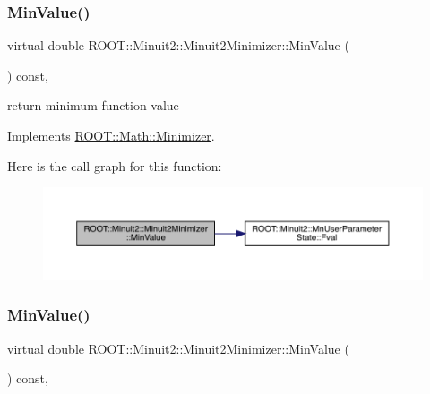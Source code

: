 \subsubsection{\texorpdfstring{MinValue()}{MinValue()}\hspace{0.1cm}{\footnotesize\ttfamily [1/3]}}
{\footnotesize\ttfamily virtual double R\+O\+O\+T\+::\+Minuit2\+::\+Minuit2\+Minimizer\+::\+Min\+Value (\begin{DoxyParamCaption}{ }\end{DoxyParamCaption}) const\hspace{0.3cm}{\ttfamily [inline]}, {\ttfamily [virtual]}}



return minimum function value 



Implements \mbox{\hyperlink{classROOT_1_1Math_1_1Minimizer_ae4845ff42bc0e244fdfa068c53b9a965}{R\+O\+O\+T\+::\+Math\+::\+Minimizer}}.

Here is the call graph for this function\+:
\nopagebreak
\begin{figure}[H]
\begin{center}
\leavevmode
\includegraphics[width=350pt]{d0/d9c/classROOT_1_1Minuit2_1_1Minuit2Minimizer_a4a1c7fc174527aefab3d8c87bf8c0672_cgraph}
\end{center}
\end{figure}
\mbox{\label{classROOT_1_1Minuit2_1_1Minuit2Minimizer_a4a1c7fc174527aefab3d8c87bf8c0672}} 
\subsubsection{\texorpdfstring{MinValue()}{MinValue()}\hspace{0.1cm}{\footnotesize\ttfamily [2/3]}}
{\footnotesize\ttfamily virtual double R\+O\+O\+T\+::\+Minuit2\+::\+Minuit2\+Minimizer\+::\+Min\+Value (\begin{DoxyParamCaption}{ }\end{DoxyParamCaption}) const\hspace{0.3cm}{\ttfamily [inline]}, {\ttfamily [virtual]}}



